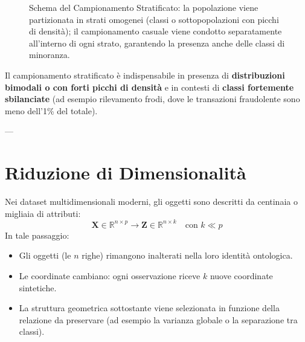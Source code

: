 \begin{figure}[H]
{%
}
\caption{Schema del Campionamento Stratificato: la popolazione viene partizionata in strati omogenei (classi o sottopopolazioni con picchi di densità); il campionamento casuale viene condotto separatamente all'interno di ogni strato, garantendo la presenza anche delle classi di minoranza.}
\label{fig:stratified-sampling-tikz}
\end{figure}

Il campionamento stratificato è indispensabile in presenza di \textbf{distribuzioni bimodali o con forti picchi di densità} e in contesti di \textbf{classi fortemente sbilanciate} (ad esempio rilevamento frodi, dove le transazioni fraudolente sono meno dell'1\% del totale).

---

\section{Riduzione di Dimensionalità}

Nei dataset multidimensionali moderni, gli oggetti sono descritti da centinaia o migliaia di attributi:
\begin{equation}
\mathbf{X} \in \mathbb{R}^{n \times p} \longrightarrow \mathbf{Z} \in \mathbb{R}^{n \times k} \quad \text{con } k \ll p
\end{equation}
In tale passaggio:
\begin{itemize}
    \item Gli oggetti (le $n$ righe) rimangono inalterati nella loro identità ontologica.
    \item Le coordinate cambiano: ogni osservazione riceve $k$ nuove coordinate sintetiche.
    \item La struttura geometrica sottostante viene selezionata in funzione della relazione da preservare (ad esempio la varianza globale o la separazione tra classi).
\end{itemize}

